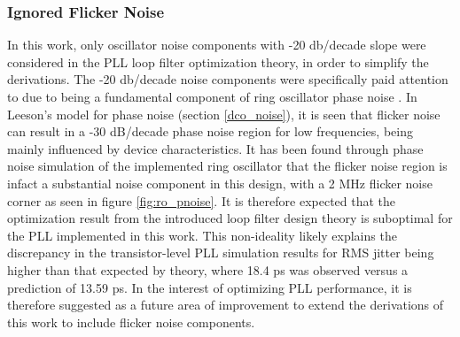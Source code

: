 	\subsubsection{Ignored Flicker Noise}
	In this work, only oscillator noise components with -20 db/decade slope were considered in the PLL loop filter optimization theory, in order to simplify the derivations. The -20 db/decade noise components were specifically paid attention to due to being a fundamental component of ring oscillator phase noise \cite{Navid2005}. In Leeson's model for phase noise (section \ref{dco_noise}), it is seen that flicker noise can result in a -30 dB/decade phase noise region for low frequencies, being mainly influenced by device characteristics. It has been found through phase noise simulation of the implemented ring oscillator that the flicker noise region is infact a substantial noise component in this design, with a 2 MHz flicker noise corner as seen in figure \ref{fig:ro_pnoise}. It is therefore expected that the optimization result from the introduced loop filter design theory is suboptimal for the PLL implemented in this work. This non-ideality likely explains the discrepancy in the transistor-level PLL simulation results for RMS jitter being higher than that expected by theory, where 18.4 ps was observed versus a prediction of 13.59 ps. In the interest of optimizing PLL performance, it is therefore suggested as a future area of improvement to extend the derivations of this work to include flicker noise components.


